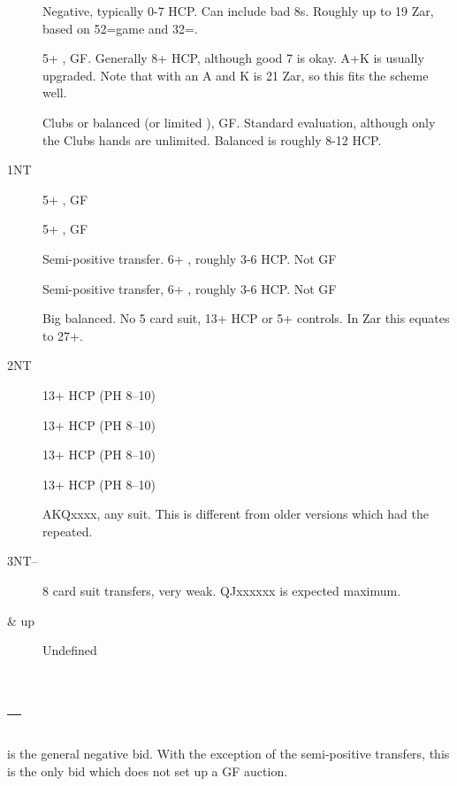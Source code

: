 \documentclass[tom-ari]{subfile}
\begin{document}
	\begin{boxbid}{}
		\begin{description}
		\item[] Negative, typically 0-7 HCP.  Can include bad 8s.  Roughly up to 19 Zar, based on 52=game and 32=.
		\item[] 5+ \spadesuit, GF.  Generally 8+ HCP, although good 7 is okay. A+K is usually upgraded.  Note that  with an A and K is 21 Zar, so this fits the scheme well.
		\item[] Clubs or balanced (or limited ), GF.  Standard evaluation, although only the Clubs hands are unlimited.  Balanced is roughly 8-12 HCP.
		\item[1NT] 5+ \heartsuit, GF
		\item[] 5+ \diamondsuit, GF
		\item[] Semi-positive transfer.  6+ \heartsuit, roughly 3-6 HCP.  Not GF
		\item[] Semi-positive transfer, 6+ \spadesuit, roughly 3-6 HCP.  Not GF
		\item[] Big balanced.  No 5 card suit, 13+ HCP or 5+ controls.  In Zar this equates to 27+.
		\item[2NT]  13+ HCP (PH 8--10)
		\item[]  13+ HCP (PH 8--10)
		\item[]  13+ HCP (PH 8--10)
		\item[]  13+ HCP (PH 8--10)
		\item[]  AKQxxxx, any suit.  This is different from older versions which had the  repeated.
		\item[3NT--] 8 card suit transfers, very weak.  QJxxxxxx is expected maximum.
		\item[ \& up] Undefined
		\end{description}
	\end{boxbid}
	
	\section[1C--1D]{--}
	
	 is the general negative bid.  With the exception of the semi-positive transfers, this is the only bid which does not set up a GF auction.
	
\end{document}
